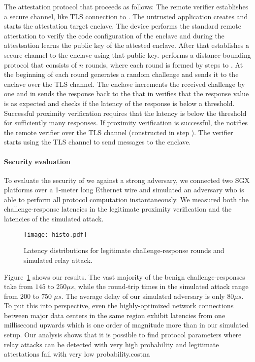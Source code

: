 The \proximitee attestation protocol that proceeds as follows: \one The remote verifier establishes a secure channel, like TLS connection to \key. \two The untrusted application creates and starts the attestation target enclave. \three The \key device performs the standard remote attestation to verify the code configuration of the enclave and during the attestsation learns the public key of the attested enclave. \four After that \key establishes a secure channel to the enclave using that public key. \five \key performs a distance-bounding protocol that consists of $n$ rounds, where each round is formed by steps \five to \eight. At the beginning of each round \key generates a random challenge and sends it to the enclave over the TLS channel. \six The enclave increments the received challenge by one and in \seven sends the response back to the \key that in \eight verifies that the response value is as expected and checks if the latency of the response is below a threshold. Successful proximity verification requires that the latency is below the threshold for sufficiently many responses. \nine If proximity verification is successful, the \key notifies the remote verifier over the TLS channel (constructed in step \one). The verifier starts using the \key TLS channel to send messages to the enclave.

\paragraph{Security evaluation}
To evaluate the security of \proximitee we against a strong adversary, we connected two SGX platforms over a 1-meter long Ethernet wire and simulated an adversary who is able to perform all protocol computation instantaneously. We measured both the challenge-response latencies in the legitimate proximity verification and the latencies of the simulated attack. 

\begin{figure}[t]
  \centering
    \texttt{[image: histo.pdf]} 
    \caption{Latency distributions for legitimate challenge-response rounds and simulated relay attack.}
    \label{graph:histogram}
\end{figure}


Figure~\ref{graph:histogram} shows our results. The vast majority of the benign challenge-responses take from $145$ to $250 \mu s$, while the round-trip times in the simulated attack range from $200$ to $750$ $\mu s$. The average delay of our simulated adversary is only $80 \mu s$. To put this into perspective, even the highly-optimized network connections between major data centers in the same region exhibit latencies from one millisecond upwards which is one order of magnitude more than in our simulated setup. Our analysis shows that it is possible to find protocol parameters where relay attacks can be detected with very high probability and legitimate attestations fail with very low probability.costna

